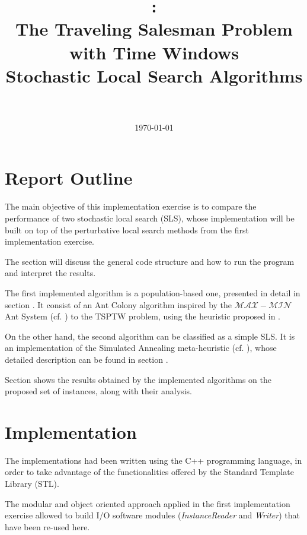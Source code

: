 \documentclass{article}
\title{
\vspace{2in}
\textmd{\textbf{\hmwkClass:\\ The Traveling Salesman Problem with Time Windows \\ Stochastic Local Search Algorithms}}\\
\vspace{0.1in}\large{\textit{\hmwkClassInstructor\ }}
\vspace{3in}
}
\author{\textbf{\hmwkAuthorName}}
\date{\today} %
\newcommand{\maxmin}{$\mathcal{MAX}-\mathcal{MIN}$}
\begin{document}
\maketitle



\newpage
\tableofcontents
\newpage

\section{Report Outline}
The main objective of this implementation exercise is to compare the performance of two stochastic local search (SLS), whose implementation will be built on top of the perturbative local search methods from the first implementation exercise.

The  section will discuss the general code structure and how to run the program and interpret the results.

The first implemented algorithm is a population-based one, presented in detail in section .
It consist of an Ant Colony algorithm inspired by the \maxmin Ant System (cf. \cite{stutzle2000max}) to the TSPTW problem, using the heuristic proposed in \cite{lopez2010beam}. 

On the other hand, the second algorithm can be classified as a simple SLS.
It is an implementation of the Simulated Annealing meta-heuristic (cf. \cite{kirkpatrick1983optimization}), whose detailed description can be found in section .

Section  shows the results obtained by the implemented algorithms on the proposed set of instances, along with their analysis.

\section{Implementation}\label{impl}
The implementations had been written using the C++ programming language, in order to take advantage of the functionalities offered by the Standard Template Library (STL).

The modular and object oriented approach applied in the first implementation exercise allowed to build I/O software modules (\emph{InstanceReader} and \emph{Writer}) that have been re-used here.
\end{document}
